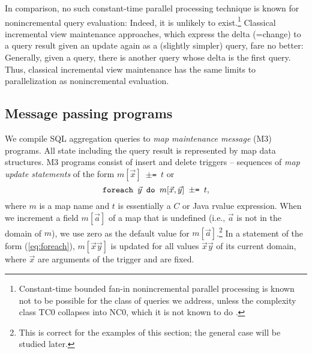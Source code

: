 In comparison, no such constant-time parallel processing technique
is known for nonincremental query
evaluation: Indeed, it is unlikely to exist.\footnote{Constant-time
bounded fan-in nonincremental
parallel processing is known not to be possible for
the class of queries we address,
unless the complexity class TC0 collapses into NC0, which it is not known
to do \cite{Joh90}.} Classical incremental view maintenance approaches, which
express the delta (=change) to a query result given an update again
as a (slightly simpler) query, fare no better: Generally,
given a query, there is another query whose delta is the first query.
Thus, classical incremental view maintenance has the same limits to
parallelization as nonincremental evaluation.


\subsection{Message passing programs}


We compile SQL aggregation queries to {\em map maintenance
message}\/ (M3) programs.
All state including the query result is represented by map data
structures. 
M3 programs consist of insert and delete triggers -- sequences
of {\em map update statements}\/ of the form
{\tt $m[\vec{x}]$ $\pm$= $t$} or
\begin{equation}
\mbox{{\tt foreach $\vec{y}$ do $m[\vec{x}, \vec{y}]$ $\pm$= $t$}},
\label{eq:foreach}
\end{equation}
where $m$ is a map name and $t$ is essentially a $C$ or Java rvalue expression.
When we increment a field $m[\vec{a}]$ of a map
that is undefined (i.e., $\vec{a}$ is not in the domain of $m$),
we use zero as the default value for $m[\vec{a}]$.\footnote{This is correct
for the examples of this section; the general case will be studied later.}
In a statement
of the form (\ref{eq:foreach}),
$m[\vec{x}\vec{y}]$ is updated for all
values $\vec{x}\vec{y}$ of its current
domain, where $\vec{x}$ are arguments of the trigger and are fixed.


